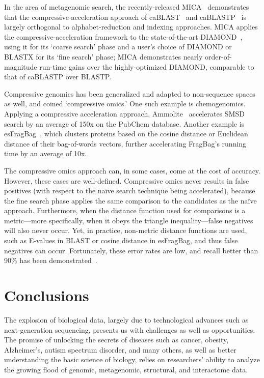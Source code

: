 \documentclass{acm_proc_article-sp}
\begin{document}
In the area of metagenomic search,
the recently-released MICA~\cite{yu2015entropy} demonstrates that the 
compressive-acceleration approach of 
caBLAST~\cite{loh2012compressive} and caBLASTP~\cite{daniels2013compressive} is 
largely orthogonal to alphabet-reduction and indexing approaches.
MICA applies the compressive-acceleration framework to the
state-of-the-art DIAMOND~\cite{buchfink2014fast}, using it
for its `coarse search' phase and a user's choice of DIAMOND or BLASTX for its
`fine search' phase; MICA demonstrates nearly order-of-magnitude run-time gains over the highly-optimized DIAMOND, comparable to that of caBLASTP over BLASTP.

Compressive genomics \cite{loh2012compressive} has been
generalized and adapted to non-sequence spaces as well, and coined
`compressive omics.'
One such example is chemogenomics.
Applying a compressive acceleration approach, Ammolite~\cite{yu2015entropy}
accelerates SMSD search by an average of 150x on the PubChem database.
Another example is 
esFragBag~\cite{yu2015entropy}, which clusters proteins based on the cosine distance or
Euclidean distance of their bag-of-words vectors, further accelerating FragBag's
running time by an average of 10x.

The compressive omics approach can, in some cases, come at the cost of accuracy.
However, these cases are well-defined.
Compressive omics never results in false positives (with respect to the na\"ive 
search technique being accelerated), because the fine search phase applies the
same comparison to the candidates as the na\"ive approach.
Furthermore, when the distance function used for comparisons is a metric---more specifically, when it obeys the triangle inequality---false negatives will also
never occur.
Yet, in practice, non-metric distance functions are used, such as E-values
in BLAST or cosine distance in esFragBag, and thus false negatives can occur.
Fortunately, these error rates are low, and recall better than 90\% has been
demonstrated~\cite{loh2012compressive,daniels2013compressive,yu2015entropy}.

\section{Conclusions}

The explosion of biological data, largely due to technological advances such as
next-generation sequencing, presents us with challenges as well as 
opportunities.
The promise of unlocking the secrets of diseases such as cancer, obesity,
Alzheimer's, autism spectrum disorder, and many others, as well as better 
understanding the basic science of biology, relies on researchers' ability to 
analyze the growing flood of genomic, metagenomic, structural, and interactome 
data.
\end{document}
